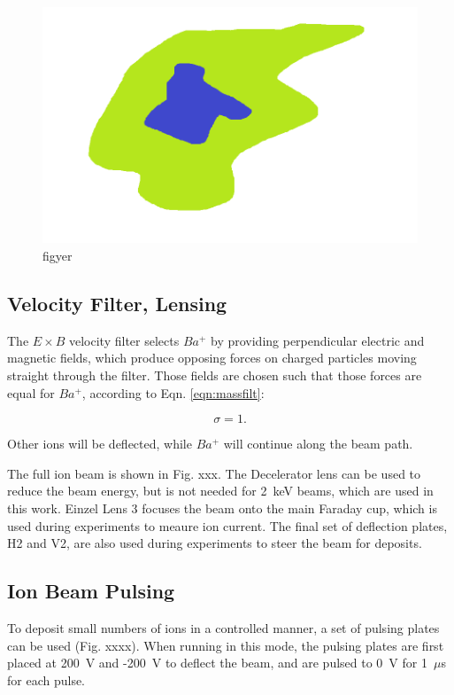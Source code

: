 \begin{figure}[H]
        \centering
                \includegraphics[width=.9\textwidth]{figures/figer.png}
                \caption{figyer}
\label{fig:testfig}
\end{figure}

\subsection{Velocity Filter, Lensing}

The $E \times B$ velocity filter selects $Ba^{+}$ by providing perpendicular electric and magnetic fields, which produce opposing forces on charged particles moving straight through the filter.  Those fields are chosen such that those forces are equal for $Ba^{+}$, according to Eqn. \ref{eqn:massfilt}:

\begin{equation}
\sigma = 1.
\label{eqn:massfilt}
\end{equation}

\noindent
Other ions will be deflected, while $Ba^{+}$ will continue along the beam path.

The full ion beam is shown in Fig. xxx.  The Decelerator lens can be used to reduce the beam energy, but is not needed for 2~keV beams, which are used in this work.  Einzel Lens 3 focuses the beam onto the main Faraday cup, which is used during experiments to meaure ion current.  The final set of deflection plates, H2 and V2, are also used during experiments to steer the beam for deposits.

\subsection{Ion Beam Pulsing}

To deposit small numbers of ions in a controlled manner, a set of pulsing plates can be used (Fig. xxxx).  When running in this mode, the pulsing plates are first placed at 200~V and -200~V to deflect the beam, and are pulsed to 0~V for 1~$\mu$s for each pulse.  

